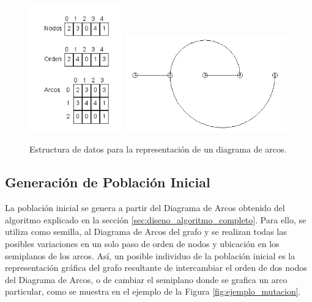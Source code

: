 	\begin{figure}[H]
		\centering
		\includegraphics[width=4cm]{imagenes/representacion_ejemplo_1.png}
		\includegraphics[width=7cm]{imagenes/representacion_ejemplo_2.png}
		\caption{Estructura de datos para la representación de un diagrama de arcos.}
		\label{fig:representacion_diagrama_arcos}
	\end{figure}
	
	\subsection{Generación de Población Inicial}
	\label{subsec:generar_poblacion_inicial}
	La población inicial se genera a partir del Diagrama de Arcos obtenido del algoritmo explicado en la sección \ref{sec:diseno_algoritmo_completo}. 
	Para ello, se utiliza como semilla, al Diagrama de Arcos del  grafo  y  se realizan todas las posibles variaciones en un solo paso de orden de nodos y ubicación en los semiplanos de los arcos. Así, un posible individuo de la población inicial es la representación gráfica del grafo resultante de intercambiar el orden de dos nodos del Diagrama de Arcos, o de cambiar el semiplano donde se grafica  un arco particular, como se muestra en el ejemplo de la Figura \ref{fig:ejemplo_mutacion}.
	
